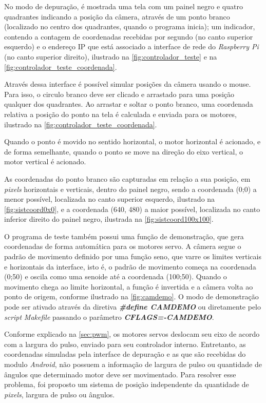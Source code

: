 No modo de depuração, é mostrada uma tela com um painel negro e quatro quadrantes indicando a posição da câmera, através de um ponto branco (localizado no centro dos quadrantes, quando o programa inicia); um indicador, contendo a contagem de coordenadas recebidas por segundo (no canto superior esquerdo) e o endereço IP que está associado a interface de rede do \textit{Raspberry Pi} (no canto superior direito), ilustrado na \autoref{fig:controlador_teste} e na \autoref{fig:controlador_teste_coordenada}. \par

Através dessa interface é possível simular posições da câmera usando o mouse. Para isso, o circulo branco deve ser clicado e arrastado para uma posição qualquer dos quadrantes. Ao arrastar e soltar o ponto branco, uma coordenada relativa a posição do ponto na tela é calculada e enviada para os motores, ilustrado na \autoref{fig:controlador_teste_coordenada}.\par

Quando o ponto é movido no sentido horizontal, o motor horizontal é acionado, e de forma semelhante, quando o ponto se move na direção do eixo vertical, o motor vertical é acionado.\par

As coordenadas do ponto branco são capturadas em relação a sua posição, em \textit{pixels} horizontais e verticais, dentro do painel negro, sendo a coordenada (0;0) a menor possível, localizada no canto superior esquerdo, ilustrado na \autoref{fig:sistcoord0x0}, e a coordenada (640, 480) a maior possível, localizada no canto inferior direito do painel negro, ilustrada na \autoref{fig:sistcoord100x100}.\par

O programa de teste também possui uma função de demonstração, que gera coordenadas de forma automática para os motores servo. A câmera segue o padrão de movimento definido por uma função seno, que varre os limites verticais e horizontais da interface, isto é, o padrão de movimento começa na coordenada (0;50) e oscila como uma senoide até a coordenada (100;50). Quando o movimento chega ao limite horizontal, a função é invertida e a câmera volta ao ponto de origem, conforme ilustrado na \autoref{fig:camdemo}. O modo de demonstração pode ser ativado através da diretiva \textit{\textbf{\#define CAMDEMO}} ou diretamente pelo \textit{script} \textit{Makefile} passando o parâmetro \textbf{\textit{CFLAGS=-CAMDEMO}}.

Conforme explicado na \autoref{sec:pwm}, os motores servos deslocam seu eixo de acordo com a largura do pulso, enviado para seu controlador interno. Entretanto, as coordenadas simuladas pela interface de depuração e as que são recebidas do modulo \textit{Android}, não possuem a informação de largura de pulso ou quantidade de ângulos que determinado motor deve ser movimentado. Para resolver esse problema, foi proposto um sistema de posição independente da quantidade de \textit{pixels}, largura de pulso ou ângulos.\par

